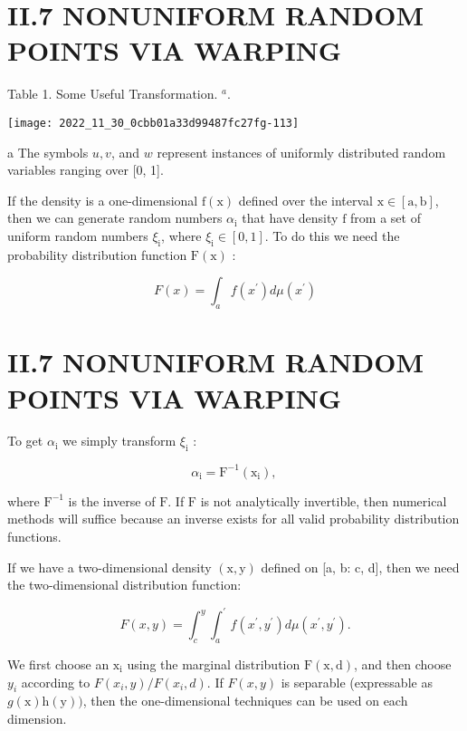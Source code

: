 \begin{CJK}{UTF8}{gbsn}
\section{II.7 NONUNIFORM RANDOM POINTS VIA WARPING}
Table 1. Some Useful Transformation. ${ }^{a}$.

\begin{center}
\texttt{[image: 2022\_11\_30\_0cbb01a33d99487fc27fg-113]}
\end{center}

a The symbols $u, v$, and $w$ represent instances of uniformly distributed random variables ranging over [0, 1].

If the density is a one-dimensional $\mathrm{f}(\mathrm{x})$ defined over the interval $\mathrm{x} \in[\mathrm{a}, \mathrm{b}]$, then we can generate random numbers $\alpha_{\mathrm{i}}$ that have density $\mathrm{f}$ from a set of uniform random numbers $\xi_{\mathrm{i}}$, where $\xi_{\mathrm{i}} \in[0,1]$. To do this we need the probability distribution function $\mathrm{F}(\mathrm{x})$ :

$$
F(x)=\int_{a} f\left(x^{\prime}\right) d \mu\left(x^{\prime}\right)
$$

\section{II.7 NONUNIFORM RANDOM POINTS VIA WARPING}
To get $\alpha_{\mathrm{i}}$ we simply transform $\xi_{\mathrm{i}}$ :

$$
\alpha_{\mathrm{i}}=\mathrm{F}^{-1}\left(\mathrm{x}_{\mathrm{i}}\right) \text {, }
$$

where $\mathrm{F}^{-1}$ is the inverse of $\mathrm{F}$. If $\mathrm{F}$ is not analytically invertible, then numerical methods will suffice because an inverse exists for all valid probability distribution functions.

If we have a two-dimensional density $(\mathrm{x}, \mathrm{y})$ defined on [a, b: c, d], then we need the two-dimensional distribution function:

$$
F(x, y)=\int_{c}^{y} \int_{a}^{\prime} f\left(x^{\prime}, y^{\prime}\right) d \mu\left(x^{\prime}, y^{\prime}\right) .
$$

We first choose an $\mathrm{x}_{\mathrm{i}}$ using the marginal distribution $\mathrm{F}(\mathrm{x}, \mathrm{d})$, and then choose $y_{i}$ according to $F\left(x_{i}, y\right) / F\left(x_{i}, d\right)$. If $F(x, y)$ is separable (expressable as $g(\mathrm{x}) \mathrm{h}(\mathrm{y}))$, then the one-dimensional techniques can be used on each dimension.


\end{CJK}
